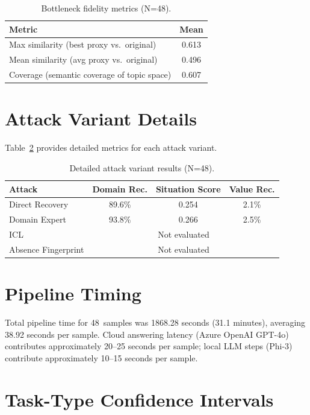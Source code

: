 \documentclass[sigconf,anonymous,review,balance=false]{acmart}
\begin{document}
\begin{table}[h]
\caption{Bottleneck fidelity metrics (N=48).}
\label{tab:fidelity}
\begin{tabular}{lc}
\toprule
\textbf{Metric} & \textbf{Mean} \\
\midrule
Max similarity (best proxy vs.\ original) & 0.613 \\
Mean similarity (avg proxy vs.\ original) & 0.496 \\
Coverage (semantic coverage of topic space) & 0.607 \\
\bottomrule
\end{tabular}
\end{table}

\section{Attack Variant Details}
\label{app:attacks}

Table~\ref{tab:attack-detail} provides detailed metrics for each attack variant.

\begin{table}[h]
\caption{Detailed attack variant results (N=48).}
\label{tab:attack-detail}
\begin{tabular}{lccc}
\toprule
\textbf{Attack} & \textbf{Domain Rec.} & \textbf{Situation Score} & \textbf{Value Rec.} \\
\midrule
Direct Recovery & 89.6\% & 0.254 & 2.1\% \\
Domain Expert & 93.8\% & 0.266 & 2.5\% \\
ICL & \multicolumn{3}{c}{Not evaluated} \\
Absence Fingerprint & \multicolumn{3}{c}{Not evaluated} \\
\bottomrule
\end{tabular}
\end{table}

\section{Pipeline Timing}
\label{app:timing}

Total pipeline time for 48~samples was 1868.28 seconds (31.1 minutes), averaging 38.92 seconds per sample. Cloud answering latency (Azure OpenAI GPT-4o) contributes approximately 20--25 seconds per sample; local LLM steps (Phi-3) contribute approximately 10--15 seconds per sample.

\section{Task-Type Confidence Intervals}
\label{app:ci}
\end{document}
